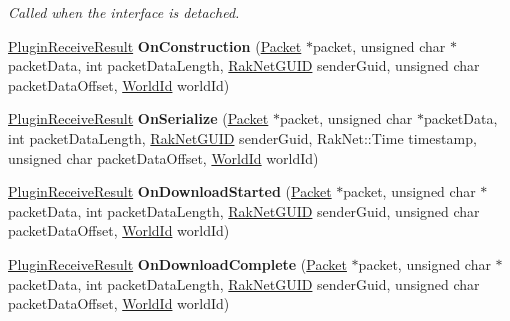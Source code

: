 \begin{DoxyCompactItemize}
\begin{DoxyCompactList}\small\item\em Called when the interface is detached. \end{DoxyCompactList}\item 
\hypertarget{class_rak_net_1_1_replica_manager3_a49dddcd4def84604eea605d2b2c5bc25}{\hyperlink{group___p_l_u_g_i_n___i_n_t_e_r_f_a_c_e___g_r_o_u_p_ga89998adaafb29e5d879113b992161085}{Plugin\-Receive\-Result} {\bfseries On\-Construction} (\hyperlink{struct_rak_net_1_1_packet}{Packet} $\ast$packet, unsigned char $\ast$packet\-Data, int packet\-Data\-Length, \hyperlink{struct_rak_net_1_1_rak_net_g_u_i_d}{Rak\-Net\-G\-U\-I\-D} sender\-Guid, unsigned char packet\-Data\-Offset, \hyperlink{group___r_e_p_l_i_c_a___m_a_n_a_g_e_r___g_r_o_u_p3_ga44b59af8e882248f61aa41d8ace38bf7}{World\-Id} world\-Id)}\label{class_rak_net_1_1_replica_manager3_a49dddcd4def84604eea605d2b2c5bc25}

\item 
\hypertarget{class_rak_net_1_1_replica_manager3_a0d4c5d1b107e4e9ba1635d3770ea3767}{\hyperlink{group___p_l_u_g_i_n___i_n_t_e_r_f_a_c_e___g_r_o_u_p_ga89998adaafb29e5d879113b992161085}{Plugin\-Receive\-Result} {\bfseries On\-Serialize} (\hyperlink{struct_rak_net_1_1_packet}{Packet} $\ast$packet, unsigned char $\ast$packet\-Data, int packet\-Data\-Length, \hyperlink{struct_rak_net_1_1_rak_net_g_u_i_d}{Rak\-Net\-G\-U\-I\-D} sender\-Guid, Rak\-Net\-::\-Time timestamp, unsigned char packet\-Data\-Offset, \hyperlink{group___r_e_p_l_i_c_a___m_a_n_a_g_e_r___g_r_o_u_p3_ga44b59af8e882248f61aa41d8ace38bf7}{World\-Id} world\-Id)}\label{class_rak_net_1_1_replica_manager3_a0d4c5d1b107e4e9ba1635d3770ea3767}

\item 
\hypertarget{class_rak_net_1_1_replica_manager3_a82861ca75184d1366a3d9340b7fabcdb}{\hyperlink{group___p_l_u_g_i_n___i_n_t_e_r_f_a_c_e___g_r_o_u_p_ga89998adaafb29e5d879113b992161085}{Plugin\-Receive\-Result} {\bfseries On\-Download\-Started} (\hyperlink{struct_rak_net_1_1_packet}{Packet} $\ast$packet, unsigned char $\ast$packet\-Data, int packet\-Data\-Length, \hyperlink{struct_rak_net_1_1_rak_net_g_u_i_d}{Rak\-Net\-G\-U\-I\-D} sender\-Guid, unsigned char packet\-Data\-Offset, \hyperlink{group___r_e_p_l_i_c_a___m_a_n_a_g_e_r___g_r_o_u_p3_ga44b59af8e882248f61aa41d8ace38bf7}{World\-Id} world\-Id)}\label{class_rak_net_1_1_replica_manager3_a82861ca75184d1366a3d9340b7fabcdb}

\item 
\hypertarget{class_rak_net_1_1_replica_manager3_af5961daca43d161bcc78af2855f1f704}{\hyperlink{group___p_l_u_g_i_n___i_n_t_e_r_f_a_c_e___g_r_o_u_p_ga89998adaafb29e5d879113b992161085}{Plugin\-Receive\-Result} {\bfseries On\-Download\-Complete} (\hyperlink{struct_rak_net_1_1_packet}{Packet} $\ast$packet, unsigned char $\ast$packet\-Data, int packet\-Data\-Length, \hyperlink{struct_rak_net_1_1_rak_net_g_u_i_d}{Rak\-Net\-G\-U\-I\-D} sender\-Guid, unsigned char packet\-Data\-Offset, \hyperlink{group___r_e_p_l_i_c_a___m_a_n_a_g_e_r___g_r_o_u_p3_ga44b59af8e882248f61aa41d8ace38bf7}{World\-Id} world\-Id)}\label{class_rak_net_1_1_replica_manager3_af5961daca43d161bcc78af2855f1f704}


\end{DoxyCompactItemize}
